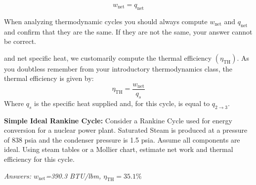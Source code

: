 \documentclass{tufte-book}
\begin{document}
\begin{equation*}
w_{\text{net}}=q_{\text{net}}
\end{equation*}

When analyzing thermodynamic cycles you should always compute $w_{\text{net}}$ and $q_{\text{net}}$ and confirm that they are the same.  If they are not the same, your answer cannot be correct.

 and net specific heat, we customarily compute the thermal efficiency $(\eta_{\text{TH}})$.  As you doubtless remember from your introductory thermodynamics class, the thermal efficiency is given by:
\begin{equation}
\eta_{\text{TH}}=\frac{w_{\text{net}}}{q_{s}}
\label{eq:thermal_efficiency}
\end{equation}
Where $q_s$ is the specific heat supplied and, for this cycle, is equal to $q_{2\rightarrow 3}$.

\begin{example}
\textbf{Simple Ideal Rankine Cycle: }Consider a Rankine Cycle used for energy conversion for a nuclear power plant.  Saturated Steam is produced at a pressure of 838 psia and the condenser pressure is 1.5 psia.  Assume all components are ideal.  Using steam tables or a Mollier chart, estimate net work and thermal efficiency for this cycle.

\vspace{0.5cm}
\emph{Answers: $w_{\text{net}}$=390.3 BTU/lbm,  $\eta_{\text{TH}}=35.1\%$}
\end{example}




















\end{document}
